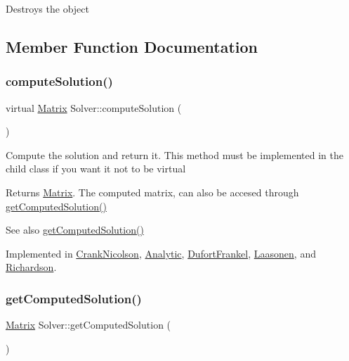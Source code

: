 Destroys the object 

\subsection{Member Function Documentation}
\mbox{\label{classSolver_a0f4ecfaed825407019995b5176e25748}} 
\subsubsection{\texorpdfstring{compute\+Solution()}{computeSolution()}}
{\footnotesize\ttfamily virtual \mbox{\hyperlink{classMatrix}{Matrix}} Solver\+::compute\+Solution (\begin{DoxyParamCaption}{ }\end{DoxyParamCaption})\hspace{0.3cm}{\ttfamily [pure virtual]}}

Compute the solution and return it. This method must be implemented in the child class if you want it not to be virtual \begin{DoxyReturn}{Returns}
\mbox{\hyperlink{classMatrix}{Matrix}}. The computed matrix, can also be accesed through \mbox{\hyperlink{classSolver_aafe88ce4130c001052e5d93c1681f90f}{get\+Computed\+Solution()}} 
\end{DoxyReturn}
\begin{DoxySeeAlso}{See also}
\mbox{\hyperlink{classSolver_aafe88ce4130c001052e5d93c1681f90f}{get\+Computed\+Solution()}} 
\end{DoxySeeAlso}


Implemented in \mbox{\hyperlink{classCrankNicolson_a94af3b8a56ef40966ea2ccd2629c2eb2}{Crank\+Nicolson}}, \mbox{\hyperlink{classAnalytic_aaa59a993d9c1a9b9c5b581f8f3e9c5b3}{Analytic}}, \mbox{\hyperlink{classDufortFrankel_aad9f0443398cd3f32b44739c1133fa94}{Dufort\+Frankel}}, \mbox{\hyperlink{classLaasonen_ae16757353c84d22b3a444116a64a6375}{Laasonen}}, and \mbox{\hyperlink{classRichardson_a8d2471f20a6b433cf7ccf5a4817b14a3}{Richardson}}.

\mbox{\label{classSolver_aafe88ce4130c001052e5d93c1681f90f}} 
\subsubsection{\texorpdfstring{get\+Computed\+Solution()}{getComputedSolution()}}
{\footnotesize\ttfamily \mbox{\hyperlink{classMatrix}{Matrix}} Solver\+::get\+Computed\+Solution (\begin{DoxyParamCaption}{ }\end{DoxyParamCaption})}

